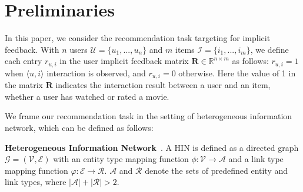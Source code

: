 \section{Preliminaries}

In this paper, we consider the recommendation task targeting for implicit feedback. With $n$ users $\mathcal{U} = \{u_1, ..., u_n\}$ and $m$ items $\mathcal{I} = \{i_1, ..., i_m\}$, we define each entry $r_{u,i}$ in the user implicit feedback matrix $\mathbf{R} \in \mathbb{R}^{n \times m}$ as follows: $r_{u,i}=1$ when $\langle u, i \rangle$ interaction is observed, and $r_{u,i}=0$ otherwise.
Here the value of 1 in the matrix $\mathbf{R}$ indicates the interaction result between a user and an item, \eg whether a user has watched or rated a movie. %

We frame our recommendation task in the setting of heterogeneous information network, which can be defined as follows:

\begin{myDef}
\textbf{Heterogeneous Information Network}~\cite{sun2011pathsim}. A HIN is defined as a directed graph ${\mathcal{G}} = (\mathcal{V}, \mathcal{E})$ with an entity type mapping function $\phi : \mathcal{V} \rightarrow \mathcal{A}$ and a link type mapping function $\varphi : \mathcal{E} \rightarrow \mathcal{R}$. $\mathcal{A}$ and $\mathcal{R}$ denote the sets of predefined entity and link types, where $|\mathcal{A}| + |\mathcal{R}| > 2$.
\end{myDef}

